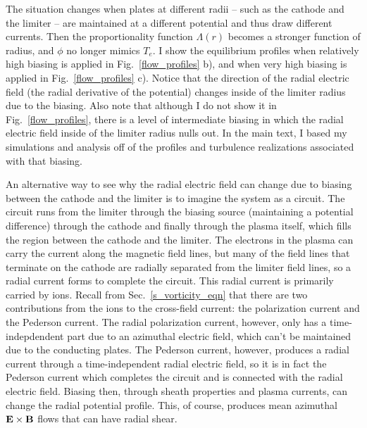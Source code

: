 The situation changes when plates at different radii -- such as the cathode and the limiter -- are maintained at a different
potential and thus draw different currents. Then the proportionality function $\Lambda(r)$ becomes a stronger function of radius, and $\phi$ no longer mimics $T_e$. 
I show the equilibrium profiles when relatively
high biasing is applied in Fig.~\ref{flow_profiles} b), and when very high biasing is applied in Fig.~\ref{flow_profiles} c). Notice that the direction of the radial electric field (the radial
derivative of the potential) changes inside of the limiter radius due to the biasing. Also note that although I do not show it in Fig.~\ref{flow_profiles}, there is a level of intermediate
biasing in which the radial electric field inside of the limiter radius nulls out. In the main text, I based my simulations and analysis off of 
the profiles and turbulence realizations associated with that biasing.

An alternative way to see why the radial electric field can change due to biasing between the cathode and the limiter is to imagine the system as a circuit. The circuit runs from the limiter
through the biasing source (maintaining a potential difference) through the cathode and finally through the plasma itself, which fills the region between the cathode and the limiter.
The electrons in the plasma can carry the current along the magnetic field lines, but many of the field lines that terminate on the cathode are radially separated from the limiter field lines,
so a radial current forms to complete the circuit. This radial current is primarily carried by ions. Recall from Sec.~\ref{s_vorticity_eqn} that there are two contributions from the ions
to the cross-field current: the polarization current and the Pederson current. The radial polarization current, however, only has a time-indepdendent part due to an azimuthal electric field,
which can't be maintained due to the conducting plates. The Pederson current, however, produces a radial current through a time-independent radial electric field, so it is in fact the Pederson
current which completes the circuit and is connected with the radial electric field. Biasing then, through sheath properties and plasma currents, can change the radial potential profile.
This, of course, produces mean azimuthal ${\bf E \times B}$ flows that can have radial shear.

